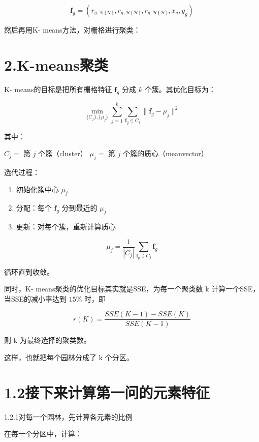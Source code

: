 \[
\mathbf{f}_g = \left(r_{g,\mathcal{N}\{\mathcal{N}\}},r_{g,\mathcal{H}\{\mathcal{H}\}},r_{g,\mathcal{H}\{\mathcal{H}\}},x_g,y_g\right)
\]

然后再用K- means方法，对栅格进行聚类：

\section{2.K-means聚类}\label{k-meansux805aux7c7b}

K- means的目标是把所有栅格特征 \(\mathbf{f}_g\) 分成 \(k\)
个簇。其优化目标为：

\[
\min_{\{C_j\} ,\{\mu_j\}}\sum_{j = 1}^{k}\sum_{\mathbf{f}_g\in C_j}\| \mathbf{f}_g - \mu_j\| ^2
\]

其中：

\(C_j =\) 第 \(j\) 个簇（cluster） \(\mu_j =\) 第 \(j\)
个簇的质心（meanvector）

选代过程：

\begin{enumerate}
\def\labelenumi{\arabic{enumi}.}
\tightlist
\item
  初始化簇中心 \(\mu_{j}\)\\
\item
  分配：每个 \(\mathbf{f}_g\) 分到最近的 \(\mu_{j}\)\\
\item
  更新：对每个簇，重新计算质心
\end{enumerate}

\[
\mu_{j} = \frac{1}{|C_{j}|}\sum_{\mathbf{f}_{g}\in C_{j}}\mathbf{f}_{g}
\]

循环直到收敛。

同时，K- means聚类的优化目标其实就是SSE，为每一个聚类数 \(\mathrm{k}\)
计算一个SSE，当SSE的减小率达到 \(15\%\) 时，即

\[
r(K) = \frac{SSE(K - 1) - SSE(K)}{SSE(K - 1)}
\]

则 \(\mathrm{k}\) 为最终选择的聚类数。

这样，也就把每个园林分成了 \(\mathrm{k}\) 个分区。

\section{1.2接下来计算第一问的元素特征}\label{ux63a5ux4e0bux6765ux8ba1ux7b97ux7b2cux4e00ux95eeux7684ux5143ux7d20ux7279ux5f81}

1.2.1对每一个园林，先计算各元素的比例

在每一个分区中，计算：

